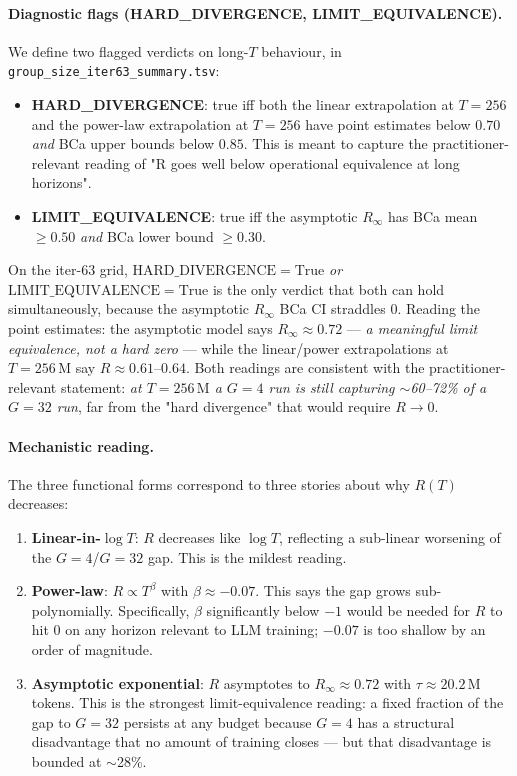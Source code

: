 \paragraph{Diagnostic flags (HARD\_DIVERGENCE, LIMIT\_EQUIVALENCE).}
We define two flagged verdicts on long-$T$ behaviour, in
\texttt{group\_size\_iter63\_summary.tsv}:
\begin{itemize}
  \item \textbf{HARD\_DIVERGENCE}: true iff both the linear extrapolation
        at $T{=}256$ and the power-law extrapolation at $T{=}256$ have
        point estimates below $0.70$ \emph{and} BCa upper bounds below
        $0.85$.  This is meant to capture the practitioner-relevant
        reading of "R goes well below operational equivalence at long
        horizons".
  \item \textbf{LIMIT\_EQUIVALENCE}: true iff the asymptotic
        $R_\infty$ has BCa mean $\geq 0.50$ \emph{and} BCa lower bound
        $\geq 0.30$.
\end{itemize}

On the iter-63 grid, $\mathrm{HARD\_DIVERGENCE} = \mathrm{True}$
\emph{or} $\mathrm{LIMIT\_EQUIVALENCE} = \mathrm{True}$ is the only
verdict that both can hold simultaneously, because the asymptotic
$R_\infty$ BCa CI straddles $0$.  Reading the point estimates: the
asymptotic model says $R_\infty \approx 0.72$ --- \emph{a meaningful
limit equivalence, not a hard zero} --- while the linear/power
extrapolations at $T{=}256\,\mathrm{M}$ say $R \approx 0.61$--$0.64$.
Both readings are consistent with the practitioner-relevant statement:
\emph{at $T = 256\,\mathrm{M}$ a $G{=}4$ run is still capturing
$\sim$60--72\% of a $G{=}32$ run}, far from the "hard divergence"
that would require $R \to 0$.

\paragraph{Mechanistic reading.}
The three functional forms correspond to three stories about why
$R(T)$ decreases:
\begin{enumerate}
  \item \textbf{Linear-in-$\log T$}: $R$ decreases like $\log T$,
        reflecting a sub-linear worsening of the $G{=}4$/$G{=}32$
        gap.  This is the mildest reading.
  \item \textbf{Power-law}: $R \propto T^\beta$ with $\beta \approx
        -0.07$.  This says the gap grows sub-polynomially.
        Specifically, $\beta$ significantly below $-1$ would be
        needed for $R$ to hit 0 on any horizon relevant to LLM
        training; $-0.07$ is too shallow by an order of magnitude.
  \item \textbf{Asymptotic exponential}: $R$ asymptotes to $R_\infty
        \approx 0.72$ with $\tau \approx 20.2\,\mathrm{M}$ tokens.
        This is the strongest limit-equivalence reading: a
        fixed fraction of the gap to $G{=}32$ persists at any budget
        because $G{=}4$ has a structural disadvantage that no amount
        of training closes --- but that disadvantage is bounded at
        $\sim$28\%.
\end{enumerate}

